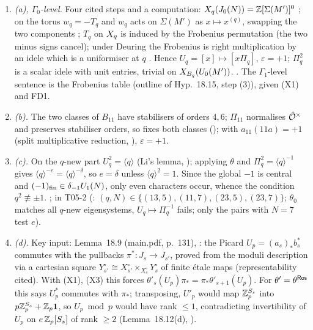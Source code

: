 \begin{outline}
\begin{enumerate}[label=(\arabic*)]
\item \emph{(a), $\Gamma_0$-level.} Four cited steps and a computation: $X_q(J_0(N))=\mathbb{Z}[\Sigma(M')]^0$ \cite[Prop.~3.1, p.~439]{Ri90};
  on the torus $w_q=-T_q$ and $w_q$ acts on $\Sigma(M')$ as $x\mapsto x^{(q)}$, swapping the two components \cite[Prop.~3.7, 3.8(i)]{Ri90};
  $T_q$ on $X_q$ is induced by the Frobenius permutation \cite[Prop.~3.8(ii)]{Ri90} (the two minus signs cancel); under Deuring the
  Frobenius is right multiplication by an idele which is a uniformiser at $q$ \cite[Rem.~3.5(b)]{Ri90}. Hence $U_q=[x]\mapsto[x\Pi_q]$,
  $\varepsilon=+1$; $\Pi_q^2$ is a scalar idele with unit entries, trivial on $X_{B_q}(U_0(M'))$. \stpmc. The $\Gamma_1$-level
  sentence is the Frobenius table (outline of Hyp.~18.15, step (3)), \stpmc{} given (X1) and FD1.
\item \emph{(b).} The two classes of $B_{11}$ have stabilisers of orders $4,6$; $\Pi_{11}$ normalises $\hat{\mathcal{O}}^\times$ and preserves
  stabiliser orders, so fixes both classes (\stproved); with $a_{11}(11a)=+1$ (split multiplicative reduction, \stknown), $\varepsilon=+1$.
\item \emph{(c).} On the $q$-new part $U_q^2=\langle q\rangle$ (Li's lemma, \cite[Lemma~3.15]{RS}); applying $\theta$ and
  $\Pi_q^2=\langle q\rangle^{-1}$ gives $\langle q\rangle^{-e}=\langle q\rangle^{-\delta}$, so $e=\delta$ unless $\langle q\rangle^2=1$. Since the
  global $-1$ is central and $(-1)_{\rm fin}\in\delta_{-1}U_1(N)$, only even characters occur, whence the condition $q^2\not\equiv\pm1$.
  \stpmc; \stcomp{} in T05-2 (: $(q,N)\in\{(13,5),(11,7),(23,5),(23,7)\}$; $\theta_0$ matches all $q$-new
  eigensystems, $U_q\mapsto\Pi_q^{-1}$ fails; only the pairs with $N=7$ test $e$).
\item \emph{(d).} Key input: Lemma~18.9 (main.pdf, p.~131), \stpmc: the Picard $U_p=(a_s)_*b_s^*$ commutes with the pullbacks
  $\pi^*:J_s\to J_{s'}$, proved from the moduli description via a cartesian square $Y_{s'}^\circ\cong X_{s'}^\circ\times_{X_s^\circ}Y_s^\circ$ of
  finite étale maps (representability cited). With (X1), (X3) this forces $\theta'_s(U_p)\pi_*=\pi_*\theta'_{s+1}(U_p)$. For
  $\theta'=\theta^{\mathsf{Ros}}$ this says $U_p^*$ commutes with $\pi_*$; transposing, $U'_p$ would map $\mathbb{Z}_p^{S_s}$ into $p\mathbb{Z}_p^{S_s}+\mathbb{Z}_p\mathbf 1$, so
  $U_p\bmod p$ would have rank $\le1$, contradicting invertibility of $U_p$ on $e\,\mathbb{Z}_p[S_s]$ of rank $\ge2$ (Lemma~18.12(d), \stproved).

\end{enumerate}
\end{outline}
